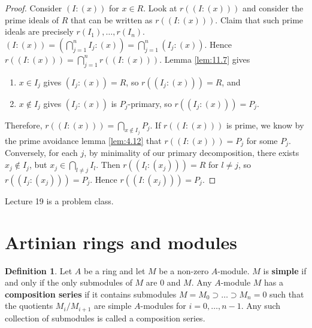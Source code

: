 \documentclass{article}
\newcommand{\rb}[1]{\left( #1 \right)}
\theoremstyle{definition}\newtheorem{definition}{Definition}[section]
\theoremstyle{definition}\newtheorem{remark}[definition]{Remark}
\theoremstyle{definition}\newtheorem*{example}{Example}
\theoremstyle{definition}\newtheorem*{note}{Note}
\begin{document}
\begin{proof}
Consider $ \rb{I : \rb{x}} $ for $ x \in R $. Look at $ r\rb{\rb{I : \rb{x}}} $ and consider the prime ideals of $ R $ that can be written as $ r\rb{\rb{I : \rb{x}}} $. Claim that such prime ideals are precisely $ r\rb{I_1}, \dots, r\rb{I_n} $. $ \rb{I : \rb{x}} = \rb{\bigcap_{j = 1}^n I_j : \rb{x}} = \bigcap_{j = 1}^n \rb{I_j : \rb{x}} $. Hence $ r\rb{\rb{I : \rb{x}}} = \bigcap_{j = 1}^n r\rb{\rb{I : \rb{x}}} $. Lemma \ref{lem:11.7} gives
\begin{enumerate}
\item $ x \in I_j $ gives $ \rb{I_j : \rb{x}} = R $, so $ r\rb{\rb{I_j : \rb{x}}} = R $, and
\item $ x \notin I_j $ gives $ \rb{I_j : \rb{x}} $ is $ P_j $-primary, so $ r\rb{\rb{I_j : \rb{x}}} = P_j $.
\end{enumerate}
Therefore, $ r\rb{\rb{I : \rb{x}}} = \bigcap_{x \notin I_j} P_j $. If $ r\rb{\rb{I : \rb{x}}} $ is prime, we know by the prime avoidance lemma \ref{lem:4.12} that $ r\rb{\rb{I : \rb{x}}} = P_j $ for some $ P_j $. Conversely, for each $ j $, by minimality of our primary decomposition, there exists $ x_j \notin I_j $, but $ x_j \in \bigcap_{l \ne j} I_l $. Then $ r\rb{\rb{I_l : \rb{x_j}}} = R $ for $ l \ne j $, so $ r\rb{\rb{I_j : \rb{x_j}}} = P_j $. Hence $ r\rb{\rb{I : \rb{x_j}}} = P_j $.
\end{proof}


Lecture 19 is a problem class.


\section{Artinian rings and modules}

\begin{definition}
Let $ A $ be a ring and let $ M $ be a non-zero $ A $-module. $ M $ is \textbf{simple} if and only if the only submodules of $ M $ are $ 0 $ and $ M $. Any $ A $-module $ M $ has a \textbf{composition series} if it contains submodules $ M = M_0 \supset \dots \supset M_n = 0 $ such that the quotients $ M_i / M_{i + 1} $ are simple $ A $-modules for $ i = 0, \dots, n - 1 $. Any such collection of submodules is called a composition series.
\end{definition}
\end{document}

